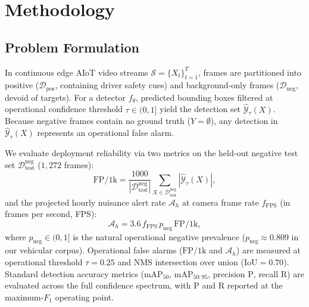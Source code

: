 \documentclass[conference]{IEEEtran}
\begin{document}
\section{Methodology}
\label{sec:methodology}

\subsection{Problem Formulation}
\label{subsec:formulation}
In continuous edge AIoT video streams $\mathcal{S} = \{X_t\}_{t=1}^T$, frames are partitioned into positive ($\mathcal{D}_{\mathrm{pos}}$, containing driver safety cues) and background-only frames ($\mathcal{D}_{\mathrm{neg}}$, devoid of targets). For a detector $f_\theta$, predicted bounding boxes filtered at operational confidence threshold $\tau \in (0, 1]$ yield the detection set $\hat{\mathcal{Y}}_\tau(X)$. Because negative frames contain no ground truth ($Y = \emptyset$), any detection in $\hat{\mathcal{Y}}_\tau(X)$ represents an operational false alarm.

We evaluate deployment reliability via two metrics on the held-out negative test set $\mathcal{D}_{\mathrm{test}}^{\mathrm{neg}}$ ($1{,}272$ frames):
\begin{equation}
\mathrm{FP/1k} = \frac{1000}{|\mathcal{D}_{\mathrm{test}}^{\mathrm{neg}}|} \sum_{X \in \mathcal{D}_{\mathrm{test}}^{\mathrm{neg}}} |\hat{\mathcal{Y}}_\tau(X)|,
\label{eq:fp1k}
\end{equation}
and the projected hourly nuisance alert rate $\mathcal{A}_h$ at camera frame rate $f_{\mathrm{FPS}}$ (in frames per second, FPS):
\begin{equation}
\mathcal{A}_h = 3.6 \, f_{\mathrm{FPS}} \, p_{\mathrm{neg}} \, \mathrm{FP/1k},
\label{eq:nuisance}
\end{equation}
where $p_{\mathrm{neg}} \in (0, 1]$ is the natural operational negative prevalence ($p_{\mathrm{neg}} \approx 0.809$ in our vehicular corpus). Operational false alarms ($\mathrm{FP/1k}$ and $\mathcal{A}_h$) are measured at operational threshold $\tau = 0.25$ and NMS intersection over union ($\mathrm{IoU} = 0.70$). Standard detection accuracy metrics ($\mathrm{mAP}_{50}$, $\mathrm{mAP}_{50:95}$, precision $\mathrm{P}$, recall $\mathrm{R}$) are evaluated across the full confidence spectrum, with $\mathrm{P}$ and $\mathrm{R}$ reported at the maximum-$F_1$ operating point.
\end{document}
